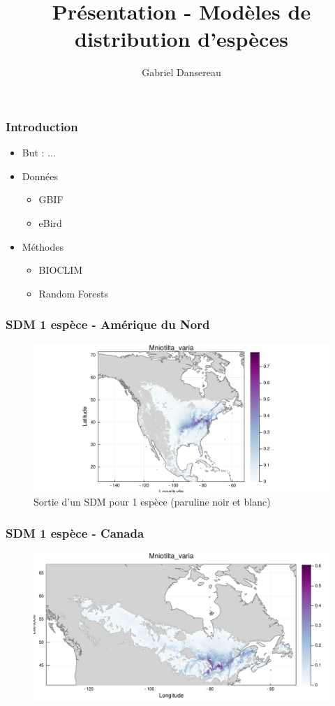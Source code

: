 \documentclass[10pt]{beamer}
\title{Présentation - Modèles de distribution d'espèces}
\author{Gabriel Dansereau}
\begin{document}
\begin{frame}
  \titlepage
\end{frame}

\begin{frame}
  \frametitle{Introduction}
  \begin{itemize}
    \item But : ...
    \item Données
    \begin{itemize}
      \item GBIF
      \item eBird
    \end{itemize}
    \item Méthodes
    \begin{itemize}
      \item BIOCLIM
      \item Random Forests
    \end{itemize}
  \end{itemize}
\end{frame}

\begin{frame}
  \frametitle{SDM 1 espèce - Amérique du Nord}
  \begin{figure}
    \centering
    \includegraphics[scale=0.4]{fig/sdm-am-Mniotilta_varia.pdf}
    \caption{Sortie d'un SDM pour 1 espèce (paruline noir et blanc)}
  \end{figure}
\end{frame}

\begin{frame}
  \frametitle{SDM 1 espèce - Canada}
  \begin{figure}
    \centering
    \includegraphics[scale=0.32]{fig/sdm-can-Mniotilta_varia.pdf}
  \end{figure}
\end{frame}
\end{document}
